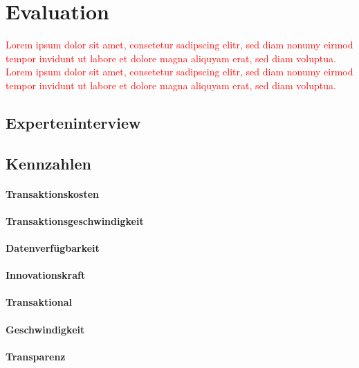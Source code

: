 \section{Evaluation} \label{sec:evaluation}
\textcolor{red}{Lorem ipsum dolor sit amet, consetetur sadipscing elitr, sed diam nonumy eirmod tempor invidunt ut labore et dolore magna aliquyam erat, sed diam voluptua. Lorem ipsum dolor sit amet, consetetur sadipscing elitr, sed diam nonumy eirmod tempor invidunt ut labore et dolore magna aliquyam erat, sed diam voluptua.}

\subsection{Experteninterview}

\subsection{Kennzahlen}

\paragraph{Transaktionskosten}

\paragraph{Transaktionsgeschwindigkeit}

\paragraph{Datenverfügbarkeit}

\paragraph{Innovationskraft}

\paragraph{Transaktional}

\paragraph{Geschwindigkeit}

\paragraph{Transparenz}

